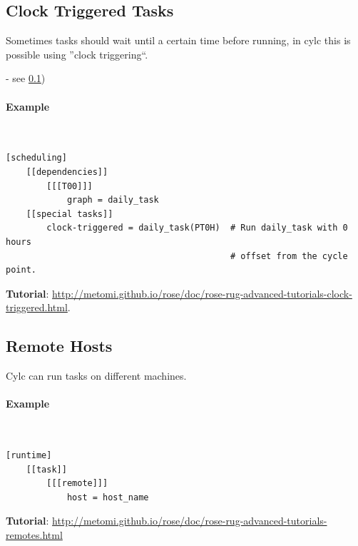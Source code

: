 \subsection{Clock Triggered Tasks}
\label{Clock Triggered Tasks}

Sometimes tasks should wait until a certain time before running, in cylc this
is possible using ''clock triggering``.


- see \ref{Clock Triggered Tasks}) 
\paragraph*{Example} $ $

\begin{lstlisting}
[scheduling]
    [[dependencies]]
        [[[T00]]]
            graph = daily_task
    [[special tasks]]
        clock-triggered = daily_task(PT0H)  # Run daily_task with 0 hours
                                            # offset from the cycle point.
\end{lstlisting}

\begin{shaded*}
\textbf{Tutorial}: \url{http://metomi.github.io/rose/doc/rose-rug-advanced-tutorials-clock-triggered.html}.
\end{shaded*}

\subsection{Remote Hosts}

Cylc can run tasks on different machines.

\paragraph*{Example} $ $

\begin{lstlisting}
[runtime]
    [[task]]
        [[[remote]]]
            host = host_name
\end{lstlisting}

\begin{shaded*}
\textbf{Tutorial}: \url{http://metomi.github.io/rose/doc/rose-rug-advanced-tutorials-remotes.html}
\end{shaded*}
